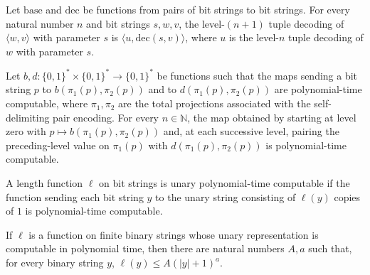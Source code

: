 \begin{theorem}
\label{Complexity.PolyHierarchy.tupleDecode_succ_pairEncode}
\leanok
{}
Let $\mathrm{base}$ and $\mathrm{dec}$ be functions from pairs of bit strings to bit
strings. For every natural number $n$ and bit strings $s,w,v$, the level-$(n+1)$ tuple
decoding of $\langle w,v\rangle$ with parameter $s$ is $\langle
u,\mathrm{dec}(s,v)\rangle$, where $u$ is the level-$n$ tuple decoding of $w$ with
parameter $s$.
\end{theorem}

\begin{theorem}
\label{Complexity.PolyHierarchy.polyTimeComputable_tupleDecode}
\leanok
{}
Let $b,d:\{0,1\}^*\times\{0,1\}^*\to\{0,1\}^*$ be functions such that the maps sending a
bit string $p$ to $b(\pi_1(p),\pi_2(p))$ and to $d(\pi_1(p),\pi_2(p))$ are
polynomial-time computable, where $\pi_1,\pi_2$ are the total projections associated
with the self-delimiting pair encoding. For every $n\in\mathbb{N}$, the map obtained by
starting at level zero with $p\mapsto b(\pi_1(p),\pi_2(p))$ and, at each successive
level, pairing the preceding-level value on $\pi_1(p)$ with $d(\pi_1(p),\pi_2(p))$ is
polynomial-time computable.
\end{theorem}

\begin{definition}
\label{Complexity.PolyHierarchy.UnaryPT}
\leanok
{}
A length function $\ell$ on bit strings is unary polynomial-time computable if the
function sending each bit string $y$ to the unary string consisting of $\ell(y)$ copies
of $1$ is polynomial-time computable.
\end{definition}

\begin{theorem}
\label{Complexity.PolyHierarchy.UnaryPT.bound}
\leanok
{}
If $\ell$ is a function on finite binary strings whose unary representation is
computable in polynomial time, then there are natural numbers $A,a$ such that, for every
binary string $y$, $\ell(y)\le A(|y|+1)^a$.
\end{theorem}

